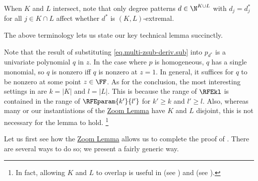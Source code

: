 When \(K\) and \(L\) intersect,
note that only degree patterns \(d \in \N^{K\cup L}\)
with \(d_j = d^*_j\) for all \(j \in K \cap L\)
affect whether \(d^*\) is \((K,L)\)-extremal.

The above terminology lets us state our key technical lemma succinctly.

Note that the result of substituting \eqref{eq.multi-zsub-deriv.sub} into $p_{d^*}$ is a univariate polynomial $q$ in $z$. In the case where $p$ is homogeneous, $q$ has a single monomial, so $q$ is nonzero iff $q$ is nonzero at $z=1$. In general, it suffices for $q$ to be nonzero at some point $z \in \FF$. As for the conclusion, the most interesting settings in  are $k=|K|$ and $l=|L|$. This is because the range of $\RFEkl$ is contained in the range of $\RFEparam{k'}{l'}$ for $k'\ge k$ and $l'\ge l$. Also, whereas many or our instantiations of the \hyperref[lem.multi-zsub-deriv]{Zoom Lemma} have \(K\) and \(L\) disjoint,
this is not necessary for the lemma to hold.%
\footnote{%
  In fact, allowing \(K\) and \(L\) to overlap is useful in
   (see ) and 
   (see ).%
}

Let us first see how the \hyperref[lem.multi-zsub-deriv]{Zoom Lemma} allows us to complete the proof of
. There are several ways to do so; we present a fairly generic way.

